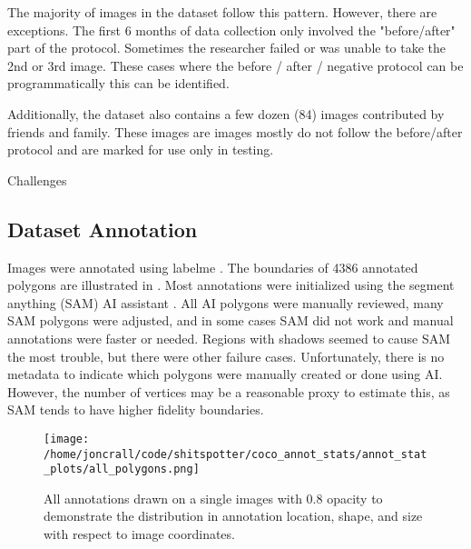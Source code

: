 \documentclass[10pt,twocolumn,letterpaper]{article}
\begin{document}
The majority of images in the dataset follow this pattern.
However, there are exceptions.
The first 6 months of data collection only involved the "before/after" part of the protocol.
Sometimes the researcher failed or was unable to take the 2nd or 3rd image.
These cases where the before / after / negative protocol can be
programmatically this can be identified.

Additionally, the dataset also contains a few dozen (84) images contributed
by friends and family. These images are images mostly do not follow the
before/after protocol and are marked for use only in testing.



Challenges

\subsection{Dataset Annotation}

Images were annotated using labelme \cite{wada_labelmeailabelme_nodate}. 
The boundaries of 4386 annotated polygons are illustrated in .
Most annotations were initialized using the segment anything (SAM) AI assistant
\cite{kirillov_segment_2023}. 
All AI polygons were manually reviewed, many SAM polygons were adjusted, and in
some cases SAM did not work and manual annotations were faster or needed.
Regions with shadows seemed to cause SAM the most trouble, but there were other
failure cases. Unfortunately, there is no metadata to indicate which polygons
were manually created or done using AI.  However, the number of vertices may be
a reasonable proxy to estimate this, as SAM tends to have higher fidelity
boundaries. 


\begin{figure}[h]
\centering
\texttt{[image: /home/joncrall/code/shitspotter/coco\_annot\_stats/annot\_stat\_plots/all\_polygons.png]}
\caption[]{
    All annotations drawn on a single images with 0.8 opacity to demonstrate
    the distribution in annotation location, shape, and size with respect to
    image coordinates.
}
\label{fig:AllPolygons}
\end{figure}
\end{document}
